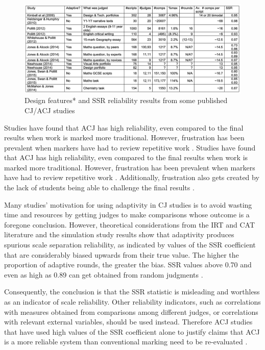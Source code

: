 	
	\begin{figure}[h]
			\includegraphics[width=\textwidth]{graphics/cambridge_results.png}
			\caption{Design features* and SSR reliability results from some published CJ/ACJ studies \cite{bramley2015investigating}}
			\label{fig:studies_comparison}
			\centering
		\end{figure}
	
	Studies have found that ACJ has high reliability, even compared to the final results when work is marked more traditional. However,  frustration has been prevalent when markers have had to review repetitive work \cite{bartholomew2019tool}. Studies have found that ACJ has high reliability, even compared to the final results when work is marked more traditional. However,  frustration has been prevalent when markers have had to review repetitive work \cite{bartholomew2019tool}. Additionally, frustration also gets created by the lack of students being able to challenge the final results \cite{bartholomew2019tool}. 
	
	Many studies' motivation for using adaptivity in CJ studies is to avoid wasting time and resources by getting judges to make comparisons whose outcome is a foregone conclusion. However, theoretical considerations from the IRT and CAT literature and the simulation study results show that adaptivity produces spurious scale separation reliability, as indicated by values of the SSR coefficient that are considerably biased upwards from their true value. The higher the proportion of adaptive rounds, the greater the bias. SSR values above 0.70 and even as high as 0.89 can get obtained from random judgments \cite{bramley2015investigating}.  
	
	Consequently, the conclusion is that the SSR statistic is misleading and worthless as an indicator of scale reliability. Other reliability indicators, such as correlations with measures obtained from comparisons among different judges, or correlations with relevant external variables, should be used instead. Therefore ACJ studies that have used high values of the SSR coefficient alone to justify claims that ACJ is a more reliable system than conventional marking need to be re-evaluated \cite{ bramley2015investigating}.
	

